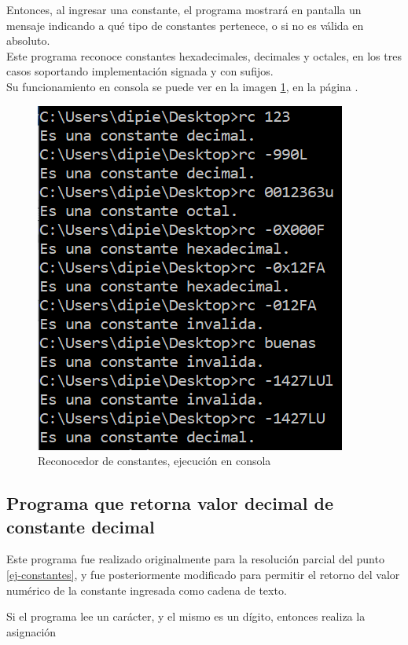 \documentclass[a4paper, 12pt]{article}
\begin{document}
Entonces, al ingresar una constante, el programa mostrará en pantalla un mensaje indicando a qué tipo de constantes pertenece, o si no es válida en absoluto. \\
Este programa reconoce constantes hexadecimales, decimales y octales, en los tres casos soportando implementación signada y con sufijos. \\
Su funcionamiento en consola se puede ver en la imagen \ref{fig:reconocedor-constantes}, en la página \pageref{fig:reconocedor-constantes}.

\begin{figure}[b]
    \centering
    \includegraphics{images/reconocedorConstantes.PNG}
    \caption{Reconocedor de constantes, ejecución en consola}
    \label{fig:reconocedor-constantes}
\end{figure}

\bigskip

\subsection{Programa que retorna valor decimal de constante decimal}
\label{ej-valordecimal}
\medbreak

Este programa fue realizado originalmente para la resolución parcial del punto \ref{ej-constantes}, y fue posteriormente modificado para permitir el retorno del valor numérico de la constante ingresada como cadena de texto.

Si el programa lee un carácter, y el mismo es un dígito, entonces realiza la asignación
\end{document}
